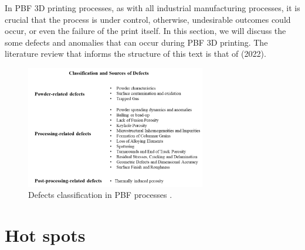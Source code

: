 In PBF 3D printing processes, as with all industrial manufacturing processes, it is crucial that the process is under control, otherwise, undesirable outcomes could occur, or even the failure of the print itself. In this section, we will discuss the some defects and anomalies that can occur during PBF 3D printing. The literature review that informs the structure of this text is that of \citeauthor{mostafaei_defects_2022} (2022).
\begin{figure}
    \centering
    \includegraphics[width=0.7\textwidth]{Images/difettoporcodio.png}
    \caption[Defects classification in PBF.]{Defects classification in PBF processes \cite{mostafaei_defects_2022}.}
    \label{fig:difettoporcodio}
\end{figure}



\section{Hot spots}
\label{}